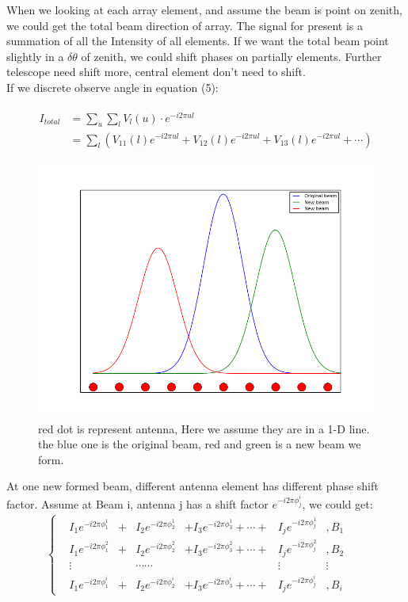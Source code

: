 \documentclass{article}
\begin{document}
When we looking at each array element, and assume the beam is point on zenith, we could get the total beam direction of array. The signal for present is a summation of all the Intensity of all elements. If we want the total beam point slightly in a $\delta\theta$ of zenith, we could shift phases on partially elements. Further telescope need shift more, central element don't need to shift.  \\
If we discrete observe angle in equation (5):

\begin{eqnarray}\begin{aligned}
I_{total} &=\sum_u\sum_lV_l(u)\cdot e^{-i2\pi ul} \\
&=\sum_l(V_{11}(l)e^{-i2\pi ul}+V_{12}(l)e^{-i2\pi ul}+V_{13}(l)e^{-i2\pi ul}+\cdots)
\end{aligned}\end{eqnarray}
\begin{figure}
\includegraphics[scale=0.5]{beam.png}
\caption{red dot is represent antenna, Here we assume they are in a 1-D line. the blue one is the original beam, red and green is a new beam we form.}
\end{figure}
At one new formed beam, different antenna element has different phase shift factor. Assume at Beam i, antenna j has a shift factor $e^{-i2\pi\phi_j^i}$, we could get:
\begin{equation}
\begin{aligned}
\left\{ \begin{aligned}
 &I_1e^{-i2\pi\phi_1^1}&+&I_2e^{-i2\pi\phi_2^1}&+I_3e^{-i2\pi\phi_3^1}+\cdots+&I_je^{-i2\pi\phi_j^1}&,B_1&\\ 
 &I_1e^{-i2\pi\phi_1^2}&+&I_2e^{-i2\pi\phi_2^2}&+I_3e^{-i2\pi\phi_3^2}+\cdots+&I_je^{-i2\pi\phi_j^2}&,B_2&\\
 &\vdots& &\cdots\cdots& &\vdots&\vdots &&\\ 
 &I_1e^{-i2\pi\phi_1^i}&+&I_2e^{-i2\pi\phi_2^i}&+I_3e^{-i2\pi\phi_3^i}+\cdots+&I_je^{-i2\pi\phi_j^i}&,B_i&
 \end{aligned}\right.\\
\end{aligned}
\end{equation}
\end{document}
